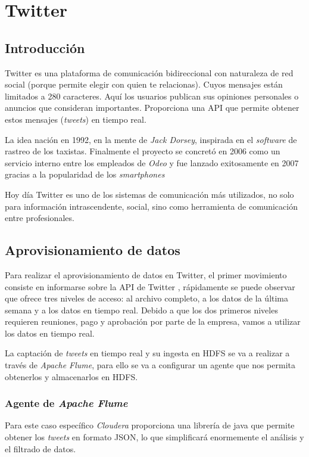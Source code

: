 \chapter{Twitter \label{sec:twitter}}

\section{Introducción}
Twitter \cite{twitter} es una plataforma de comunicación bidireccional con naturaleza de red social (porque permite elegir con quien te relacionas). Cuyos mensajes están limitados a 280 caracteres. Aquí los usuarios publican sus opiniones personales o anuncios que consideran importantes. Proporciona una \gls{API} que permite obtener estos mensajes (\textit{tweets}) en tiempo real.

La idea nación en 1992, en la mente de \textit{Jack Dorsey}, inspirada en el \textit{software} de rastreo de los taxistas. Finalmente el proyecto se concretó en 2006 como un servicio interno entre los empleados de \textit{Odeo} y fue lanzado exitosamente en 2007 gracias a la popularidad de los \textit{smartphones}

Hoy día Twitter es uno de los sistemas de comunicación más utilizados, no solo para información intrascendente, social, sino como herramienta de comunicación entre profesionales.

\clearpage
\section{Aprovisionamiento de datos}
Para realizar el aprovisionamiento de datos en Twitter, el primer movimiento consiste en informarse sobre la \gls{API} de Twitter \cite{apiTwitter}, rápidamente se puede observar que ofrece tres niveles de acceso: al archivo completo, a los datos de la última semana y a los datos en tiempo real. Debido a que los dos primeros niveles requieren reuniones, pago y aprobación por parte de la empresa, vamos a utilizar los datos en tiempo real.

La captación de \textit{tweets} en tiempo real y su ingesta en \gls{HDFS} se va a realizar a través de \textit{Apache Flume}, para ello se va a configurar un agente que nos permita obtenerlos y almacenarlos en \gls{HDFS}.

\subsection{Agente de \textit{Apache Flume}}
Para este caso específico \textit{Cloudera} \cite{cloudera} proporciona una librería de java que permite obtener los \textit{tweets} en formato \gls{JSON}, lo que simplificará enormemente el análisis y el filtrado de datos.

